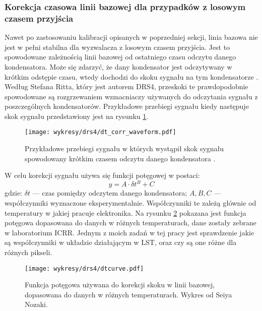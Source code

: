 \documentclass[a4paper,11pt,twoside]{article}
\begin{document}
\subsubsection{Korekcja czasowa linii bazowej dla przypadków z losowym czasem przyjścia}
Nawet po zastosowaniu kalibracji opisanych w poprzedniej sekcji, linia bazowa nie jest w pełni stabilna dla wyzwalacza z losowym czasem przyjścia. Jest to spowodowane zależnością linii bazowej od ostatniego czasu odczytu danego kondensatora. Może się zdarzyć, że dany kondensator jest odczytywany w krótkim odstępie czasu, wtedy dochodzi do skoku sygnału na tym kondensatorze \cite{drs4_magic}. Według Stefana Ritta, który jest autorem DRS4, przeskoki te prawdopodobnie spowodowane są rozgrzewaniem wzmacniaczy używanych do odczytania sygnału z poszczególnych kondensatorów. Przykładowe przebiegi sygnału kiedy następuje skok sygnału przedstawiony jest na rysunku \ref{fig:dt_corr}. 
\begin{figure}[H] 
\centering
\texttt{[image: wykresy/drs4/dt\_corr\_waveform.pdf]}
\caption{Przykładowe przebiegi sygnału w których wystąpił skok sygnału spowodowany krótkim czasem odczytu danego kondensatora \cite{drs4_magic}.}
\label{fig:dt_corr}
\end{figure}
W celu korekcji sygnału używa się funkcji potęgowej w postaci:
\begin{equation}
\label{eqn:power_law}
y = A \cdot \delta t^B + C
\end{equation}
gdzie: $\delta t$ --- czas pomiędzy odczytem danego kondensatora; $A, B, C$ --- współczynniki wyznaczone eksperymentalnie. 
Współczynniki te zależą głównie od temperatury w jakiej pracuje elektronika. Na rysunku \ref{fig:dt_corr_fit} pokazana jest funkcja potęgowa dopasowana do danych w różnych temperaturach, dane zostały zebrane w laboratorium ICRR. Jednym z moich zadań w tej pracy jest sprawdzenie jakie są współczynniki w układzie działającym w LST, oraz czy są one różne dla różnych pikseli. 
\begin{figure}[H] 
\centering
\texttt{[image: wykresy/drs4/dtcurve.pdf]}
\caption{Funkcja potęgowa używana do korekcji skoku w linii bazowej, dopasowana do danych w różnych temperaturach. Wykres od Seiya Nozaki.}
\label{fig:dt_corr_fit}
\end{figure}
\newpage
\end{document}
